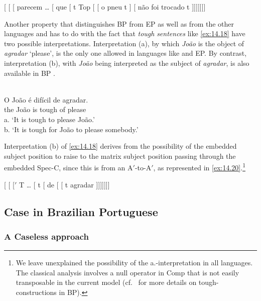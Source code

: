 \documentclass[output=paper]{langsci/langscibook}
\begin{document}
\ea\label{ex:14.17}
    {}[ [ [ parecem \dots{} [ que [
    t Top [ [ o pneu t ] [ não foi
    trocado t ]]]]]]]
\z

Another property that distinguishes \gls{BP} from \gls{EP} as well as from
the other  languages and  has to do with the fact that
\emph{tough} \emph{sentences} like \eqref{ex:14.18} have two possible
interpretations. Interpretation (a), by which \emph{João} is the object of
\emph{agradar} ‘please’, is the only one allowed in languages like  and
EP. By contrast, interpretation (b), with \emph{João} being interpreted as the
subject of \emph{agradar}, is also available in \gls{BP} \citep{Galves1987}.

\ea%
    \label{ex:14.18}\\
    \gll    O João é difícil de agradar.\\
            the João is tough of please\\
    \glt    a. ‘It is tough to please João.’\\
            b. ‘It is tough for João to please somebody.’
\z

Interpretation (b) of  \eqref{ex:14.18} derives from the possibility of the
embedded subject position to raise to the matrix subject position passing
through the embedded Spec-C, since this  is from an A$'$-to-A$'$, as
represented in \eqref{ex:14.20}.\footnote{We leave unexplained the possibility
of the a.-interpretation in all languages. The classical analysis involves a
null operator in Comp that is not easily transposable in the current model
(cf.\ \citealt{Moreno2014} for more details on tough-constructions in BP).}

\ea\label{ex:14.19}
    {}[ [ [$'$ T \dots{} [ t [ de
    [ [ t agradar ]]]]]]]
\z

\subsection{Case in Brazilian Portuguese}\label{sec:14.4.2}

\subsubsection{A Caseless approach}\label{sec:15.4.2.1}
\end{document}
